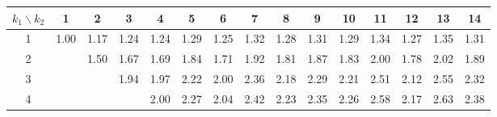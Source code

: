 \documentclass[a3paper,extrafontsizes,20pt, ngerman]{memoir}
\begin{document}
\begin{figure}
    \vspace{0.5em}

    \begin{tabular}{c|cccccccccccccc}
        $k_1 \backslash k_2$ & 1                                & 2                                & 3                                & 4                                & 5                                & 6                                & 7                                & 8                                & 9                                & 10                               & 11                               & 12                               & 13                               & 14                               \\
        \hline
        1                    & \textcolor[HTML]{ 0020ff }{1.00} & \textcolor[HTML]{ 0d20f1 }{1.17} & \textcolor[HTML]{ 1220ec }{1.24} & \textcolor[HTML]{ 1320eb }{1.24} & \textcolor[HTML]{ 1720e7 }{1.29} & \textcolor[HTML]{ 1420ea }{1.25} & \textcolor[HTML]{ 1920e5 }{1.32} & \textcolor[HTML]{ 1620e8 }{1.28} & \textcolor[HTML]{ 1820e6 }{1.31} & \textcolor[HTML]{ 1720e7 }{1.29} & \textcolor[HTML]{ 1b20e3 }{1.34} & \textcolor[HTML]{ 1520e9 }{1.27} & \textcolor[HTML]{ 1c20e2 }{1.35} & \textcolor[HTML]{ 1820e6 }{1.31} \\
        2                    &                                  & \textcolor[HTML]{ 2720d7 }{1.50} & \textcolor[HTML]{ 3520c9 }{1.67} & \textcolor[HTML]{ 3620c8 }{1.69} & \textcolor[HTML]{ 4220bc }{1.84} & \textcolor[HTML]{ 3820c6 }{1.71} & \textcolor[HTML]{ 4920b5 }{1.92} & \textcolor[HTML]{ 4020be }{1.81} & \textcolor[HTML]{ 4520b9 }{1.87} & \textcolor[HTML]{ 4220bc }{1.83} & \textcolor[HTML]{ 4f20af }{2.00} & \textcolor[HTML]{ 3e20c0 }{1.78} & \textcolor[HTML]{ 5120ad }{2.02} & \textcolor[HTML]{ 4720b7 }{1.89} \\
        3                    &                                  &                                  & \textcolor[HTML]{ 4b20b3 }{1.94} & \textcolor[HTML]{ 4d20b1 }{1.97} & \textcolor[HTML]{ 61209d }{2.22} & \textcolor[HTML]{ 5020ae }{2.00} & \textcolor[HTML]{ 6c2092 }{2.36} & \textcolor[HTML]{ 5e20a0 }{2.18} & \textcolor[HTML]{ 662098 }{2.29} & \textcolor[HTML]{ 60209e }{2.21} & \textcolor[HTML]{ 782086 }{2.51} & \textcolor[HTML]{ 5920a5 }{2.12} & \textcolor[HTML]{ 7b2083 }{2.55} & \textcolor[HTML]{ 692095 }{2.32} \\
        4                    &                                  &                                  &                                  & \textcolor[HTML]{ 4f20af }{2.00} & \textcolor[HTML]{ 652099 }{2.27} & \textcolor[HTML]{ 5220ac }{2.04} & \textcolor[HTML]{ 71208d }{2.42} & \textcolor[HTML]{ 61209d }{2.23} & \textcolor[HTML]{ 6b2093 }{2.35} & \textcolor[HTML]{ 64209a }{2.26} & \textcolor[HTML]{ 7e2080 }{2.58} & \textcolor[HTML]{ 5c20a2 }{2.17} & \textcolor[HTML]{ 82207c }{2.63} & \textcolor[HTML]{ 6d2091 }{2.38} \\

\end{tabular}
\end{figure}
\end{document}
